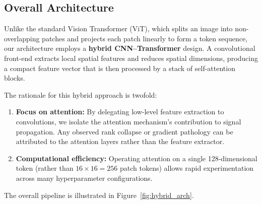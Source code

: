 \documentclass[12pt, a4paper]{article}
\begin{document}
\subsection{Overall Architecture}

Unlike the standard Vision Transformer (ViT), which splits an image into
non-overlapping patches and projects each patch linearly to form a token
sequence, our architecture employs a \textbf{hybrid CNN--Transformer}
design. A convolutional front-end extracts local spatial features and
reduces spatial dimensions, producing a compact feature vector that is
then processed by a stack of self-attention blocks.

The rationale for this hybrid approach is twofold:
\begin{enumerate}[label=(\roman*)]
    \item \textbf{Focus on attention:} By delegating low-level feature
          extraction to convolutions, we isolate the attention
          mechanism's contribution to signal propagation. Any observed
          rank collapse or gradient pathology can be attributed to the
          attention layers rather than the feature extractor.
    \item \textbf{Computational efficiency:} Operating attention on a
          single 128-dimensional token (rather than $16 \times 16 = 256$
          patch tokens) allows rapid experimentation across many
          hyperparameter configurations.
\end{enumerate}

The overall pipeline is illustrated in Figure~\ref{fig:hybrid_arch}.
\end{document}
